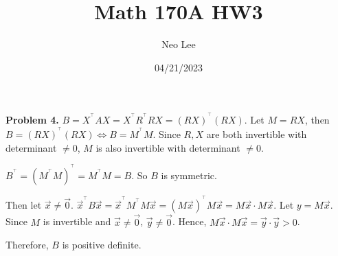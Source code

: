 \documentclass{article}
\title{Math 170A HW3}
\author{Neo Lee}
\date{04/21/2023}
\begin{document}
 

\maketitle 

\textbf{Problem 4.}
$B = X^{^\top}AX = X^{^\top}R^{^\top}RX = (RX)^{^\top}(RX)$. 
Let $M = RX$, then $B = (RX)^{^\top}(RX) \Leftrightarrow B = M^{^\top}M$. 
Since $R, X$ are both invertible with determinant $\neq 0$, $M$ is also invertible with determinant $\neq 0$.

$B^{^\top} = (M^{^\top}M)^{^\top} = M^{^\top}M = B$. So $B$ is symmetric.

Then let $\vec{x}\neq \vec{0}$. $\vec{x}^{^\top}B\vec{x} = \vec{x}^{^\top}M^{^\top}M\vec{x} = (M\vec{x})^{^\top}M\vec{x} = M\vec{x} \cdot M\vec{x}$. 
Let $y = M\vec{x}$. 
Since $M$ is invertible and $\vec{x} \neq \vec{0}$, $\vec{y}\neq\vec{0}$.
Hence, $M\vec{x}\cdot M\vec{x} = \vec{y}\cdot \vec{y} > 0$.

Therefore, $B$ is positive definite.
\end{document}
